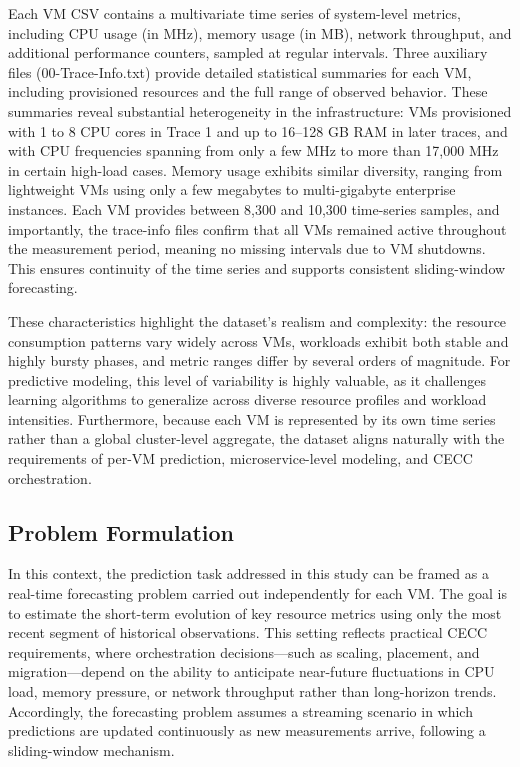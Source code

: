 \documentclass[a4paper,fleqn]{cas-dc}
\begin{document}
Each VM CSV contains a multivariate time series of system-level metrics, including CPU usage (in MHz), memory usage (in MB), network throughput, and additional performance counters, sampled at regular intervals. Three auxiliary files (00-Trace-Info.txt) provide detailed statistical summaries for each VM, including provisioned resources and the full range of observed behavior. These summaries reveal substantial heterogeneity in the infrastructure: VMs provisioned with 1 to 8 CPU cores in Trace 1 and up to 16--128 GB RAM in later traces, and with CPU frequencies spanning from only a few MHz to more than 17,000 MHz in certain high-load cases. Memory usage exhibits similar diversity, ranging from lightweight VMs using only a few megabytes to multi-gigabyte enterprise instances. Each VM provides between 8,300 and 10,300 time-series samples, and importantly, the trace-info files confirm that all VMs remained active throughout the measurement period, meaning no missing intervals due to VM shutdowns. This ensures continuity of the time series and supports consistent sliding-window forecasting.

These characteristics highlight the dataset's realism and complexity: the resource consumption patterns vary widely across VMs, workloads exhibit both stable and highly bursty phases, and metric ranges differ by several orders of magnitude. For predictive modeling, this level of variability is highly valuable, as it challenges learning algorithms to generalize across diverse resource profiles and workload intensities. Furthermore, because each VM is represented by its own time series rather than a global cluster-level aggregate, the dataset aligns naturally with the requirements of per-VM prediction, microservice-level modeling, and CECC orchestration.

\subsection{Problem Formulation}
\label{subsec:problem}

In this context, the prediction task addressed in this study can be framed as a real-time forecasting problem carried out independently for each VM. The goal is to estimate the short-term evolution of key resource metrics using only the most recent segment of historical observations. This setting reflects practical CECC requirements, where orchestration decisions---such as scaling, placement, and migration---depend on the ability to anticipate near-future fluctuations in CPU load, memory pressure, or network throughput rather than long-horizon trends. Accordingly, the forecasting problem assumes a streaming scenario in which predictions are updated continuously as new measurements arrive, following a sliding-window mechanism.
\end{document}
